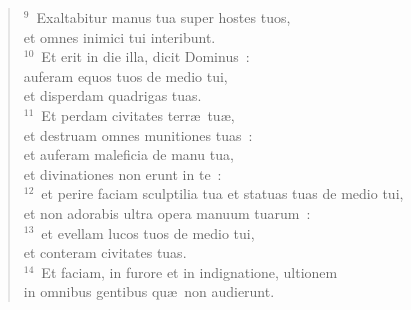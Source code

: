 \begin{verse}
${}^{9}$~Exaltabitur manus tua super hostes tuos,\\ et omnes inimici tui interibunt.\\
${}^{10}$~Et erit in die illa, dicit Dominus~:\\ auferam equos tuos de medio tui,\\ et disperdam quadrigas tuas.\\
${}^{11}$~Et perdam civitates terr\ae\ tu\ae ,\\ et destruam omnes munitiones tuas~:\\ et auferam maleficia de manu tua,\\ et divinationes non erunt in te~:\\
${}^{12}$~et perire faciam sculptilia tua et statuas tuas de medio tui,\\ et non adorabis ultra opera manuum tuarum~:\\
${}^{13}$~et evellam lucos tuos de medio tui,\\ et conteram civitates tuas.\\
${}^{14}$~Et faciam, in furore et in indignatione, ultionem\\ in omnibus gentibus qu\ae\ non audierunt.\end{verse}


